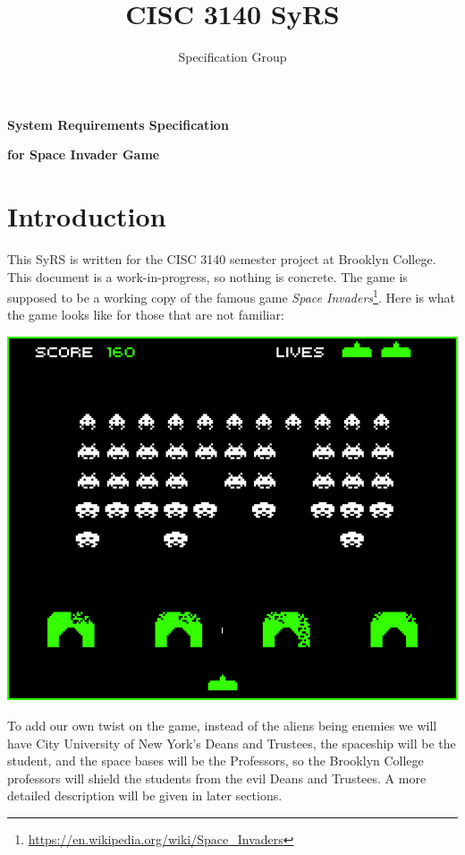 \documentclass[12pt, letterpaper]{article}
\author{Specification Group}
\title{CISC 3140 SyRS}
\begin{document}
   \centerline{\textbf{System Requirements Specification}}
   \centerline{\textbf{for Space Invader Game}}
   
   \tableofcontents
    
    \newpage{}
    
   \vspace{50px}
   
   
   \section{Introduction}
   
   \noindent This SyRS is written for the CISC 3140 semester project at Brooklyn College. This document is a work-in-progress, so nothing is concrete. The game is supposed to be a working copy of the famous game \textit{Space Invaders}\footnote{\href{https://en.wikipedia.org/wiki/Space_Invaders}{https://en.wikipedia.org/wiki/Space\_Invaders}}. Here is what the game looks like for those that are not familiar:
       
   \label{gamepic}
   \vspace{10px}
   \includegraphics[scale=0.5]{si}
   \vspace{10px}
    

    \noindent To add our own twist on the game, instead of the aliens being enemies we will have City University of New York's Deans and Trustees, the spaceship will be the student, and the space bases will be the Professors, so the Brooklyn College professors will shield the students from the evil Deans and Trustees. A more detailed description will be given in later sections. 
   
\end{document}
